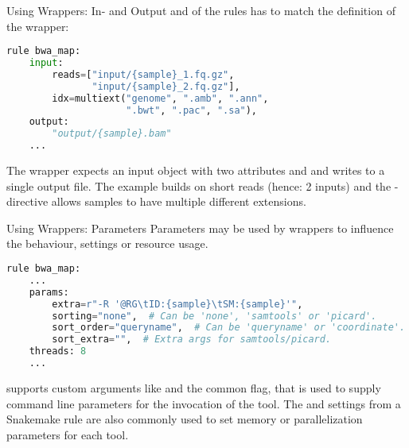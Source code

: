 \begin{frame}[fragile]{Using Wrappers: In- and Output}
     and  of the rules has to match the definition of the wrapper:
    \begin{lstlisting}[language=Python,style=Python,basicstyle=\tiny]
rule bwa_map:
    input:
        reads=["input/{sample}_1.fq.gz", 
               "input/{sample}_2.fq.gz"],
        idx=multiext("genome", ".amb", ".ann", 
                     ".bwt", ".pac", ".sa"),
    output:
        "output/{sample}.bam"
    ...
    \end{lstlisting}
    \begin{docs}
        The  wrapper expects an input object with two attributes
         and  and writes to a single output file.\newline
        The example builds on short reads (hence: 2 inputs) and the -directive allows samples to have multiple different extensions.
    \end{docs}
\end{frame}

\begin{frame}[fragile]{Using Wrappers: Parameters}
    Parameters may be used by wrappers to influence the behaviour, settings or resource usage.
    \begin{lstlisting}[language=Python,style=Python,basicstyle=\tiny]
rule bwa_map:
    ...
    params:
        extra=r"-R '@RG\tID:{sample}\tSM:{sample}'",
        sorting="none",  # Can be 'none', 'samtools' or 'picard'.
        sort_order="queryname",  # Can be 'queryname' or 'coordinate'.
        sort_extra="",  # Extra args for samtools/picard.
    threads: 8
    ...
    \end{lstlisting}
    \begin{docs}
         supports custom arguments like  and
        the common  flag, that is used to supply command line parameters
        for the invocation of the tool. The  and 
        settings from a Snakemake rule are also commonly used to set memory or parallelization parameters for each tool.
    \end{docs}
\end{frame}
 
